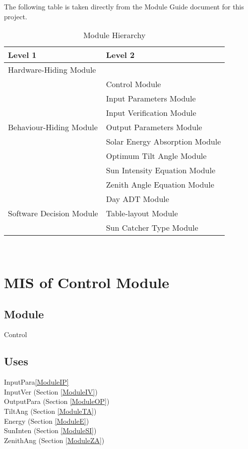 \documentclass[12pt, titlepage]{article}
\begin{document}
The following table is taken directly from the Module Guide document for this
project.

\begin{table}[h!]
\centering
\begin{tabular}{p{} p{}}
\toprule
\textbf{Level 1} & \textbf{Level 2}\\
\midrule

{Hardware-Hiding Module} & ~ \\
\midrule

\multirow{7}{0.3\textwidth}{Behaviour-Hiding
 Module}& Control Module\\
& Input Parameters Module\\
& Input Verification Module\\
& Output Parameters Module\\
& Solar Energy Absorption Module\\
& Optimum Tilt Angle Module\\
& Sun Intensity Equation Module\\
& Zenith Angle Equation Module\\
\midrule

\multirow{3}{0.3\textwidth}{Software Decision Module} 
& Day ADT Module\\
& Table-layout Module\\
& Sun Catcher Type 
Module\\
\bottomrule

\end{tabular}
\caption{Module Hierarchy}
\label{TblMH}
\end{table}

\newpage
~\newpage


\section{MIS of Control Module} \label{ModuleC} 

\subsection{Module}
Control

\subsection{Uses}
InputPara\ref{ModuleIP} \\
InputVer (Section \ref{ModuleIV})\\
OutputPara (Section \ref{ModuleOP})\\
TiltAng (Section \ref{ModuleTA})\\
Energy (Section \ref{ModuleE})\\
SunInten (Section \ref{ModuleSI})\\
ZenithAng (Section \ref{ModuleZA})\\
\end{document}

